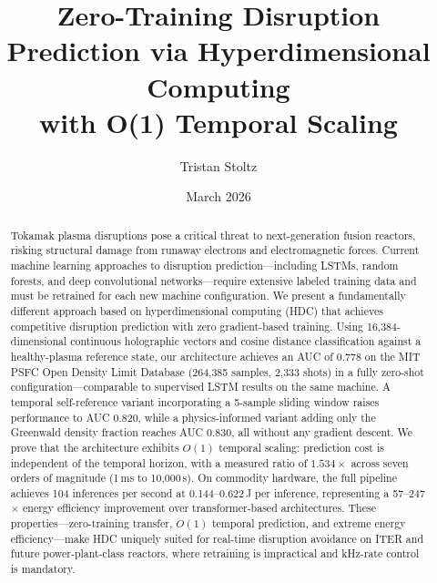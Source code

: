 \documentclass[twocolumn,prl,aps,superscriptaddress,floatfix]{revtex4-2}
\begin{document}
\title{Zero-Training Disruption Prediction via Hyperdimensional Computing\\with O(1) Temporal Scaling}

\author{Tristan Stoltz}

\date{March 2026}

\begin{abstract}
Tokamak plasma disruptions pose a critical threat to next-generation fusion reactors, risking structural damage from runaway electrons and electromagnetic forces. Current machine learning approaches to disruption prediction---including LSTMs, random forests, and deep convolutional networks---require extensive labeled training data and must be retrained for each new machine configuration. We present a fundamentally different approach based on hyperdimensional computing (HDC) that achieves competitive disruption prediction with zero gradient-based training. Using 16,384-dimensional continuous holographic vectors and cosine distance classification against a healthy-plasma reference state, our architecture achieves an AUC of 0.778 on the MIT PSFC Open Density Limit Database (264,385 samples, 2,333 shots) in a fully zero-shot configuration---comparable to supervised LSTM results on the same machine. A temporal self-reference variant incorporating a 5-sample sliding window raises performance to AUC 0.820, while a physics-informed variant adding only the Greenwald density fraction reaches AUC 0.830, all without any gradient descent. We prove that the architecture exhibits $O(1)$ temporal scaling: prediction cost is independent of the temporal horizon, with a measured ratio of $1.534\times$ across seven orders of magnitude (1\,ms to 10{,}000\,s). On commodity hardware, the full pipeline achieves 104 inferences per second at 0.144--0.622\,J per inference, representing a 57--247$\times$ energy efficiency improvement over transformer-based architectures. These properties---zero-training transfer, $O(1)$ temporal prediction, and extreme energy efficiency---make HDC uniquely suited for real-time disruption avoidance on ITER and future power-plant-class reactors, where retraining is impractical and kHz-rate control is mandatory.
\end{abstract}


\maketitle
\end{document}
